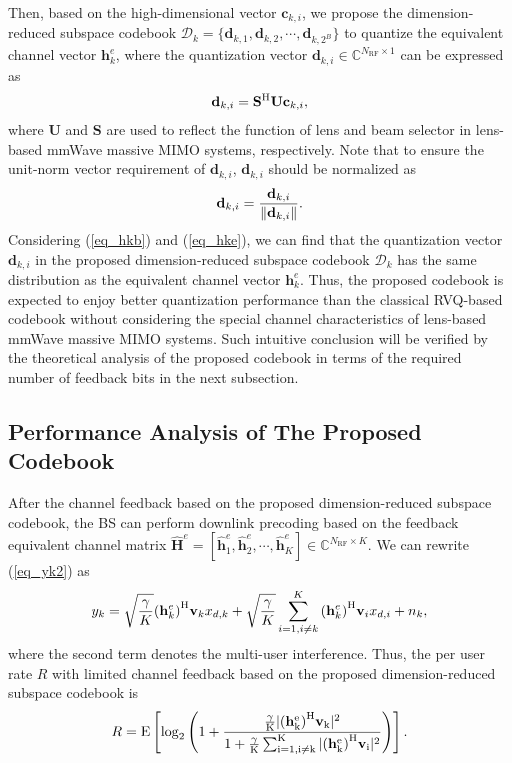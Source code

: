 \documentclass[10pt,twocolumn,twoside]{IEEEtran}
\begin{document}
Then, based on the high-dimensional vector $\mathbf{c}_{k,i}$, we propose the dimension-reduced subspace codebook $\mathcal{D}_k=\{\mathbf{d}_{k,1},\mathbf{d}_{k,2},\cdots,\mathbf{d}_{k,2^B}\}$ to quantize the equivalent channel vector $\mathbf{h}_k^e$, where the quantization vector $\mathbf{d}_{k,i}\in\mathbb{C}^{N_\text{RF}\times 1}$ can be expressed as
\begin{align}\label{eq_dki1}
\mathbf{d}_{k,i}=\mathbf{S}^{\rm{H}}\mathbf{U}\mathbf{c}_{k,i},
\end{align}
where $\mathbf{U}$ and $\mathbf{S}$ are used to reflect the function of lens and beam selector in lens-based mmWave massive MIMO systems, respectively.
Note that to ensure the unit-norm vector requirement of $\mathbf{d}_{k,i}$, $\mathbf{d}_{k,i}$ should be normalized as
\begin{align} \label{eq_dki2}
\vspace{-1mm}
\mathbf{d}_{k,i}=\frac{\mathbf{d}_{k,i}}{\|\mathbf{d}_{k,i}\|}.
\vspace{-1mm}
\end{align}
Considering (\ref{eq_hkb}) and (\ref{eq_hke}), we can find that the quantization vector $\mathbf{d}_{k,i}$ in the proposed dimension-reduced subspace codebook $\mathcal{D}_k$ has the same distribution as the equivalent channel vector $\mathbf{h}_k^e$.
Thus, the proposed codebook is expected to enjoy better quantization performance than the classical RVQ-based codebook without considering the special channel characteristics of lens-based mmWave massive MIMO systems.
Such intuitive conclusion will be verified by the theoretical analysis of the proposed codebook in terms of the required number of feedback bits in the next subsection.

\subsection{Performance Analysis of The Proposed Codebook}\label{S3.3}
After the channel feedback based on the proposed dimension-reduced subspace codebook, the BS can perform downlink precoding based on the feedback equivalent channel matrix $\mathbf{\hat{H}}^e=[\mathbf{\hat{h}}_1^e,\mathbf{\hat{h}}_2^e,\cdots,\mathbf{\hat{h}}_K^e]\in\mathbb{C}^{N_{\text{RF}}\times K}$.
We can rewrite (\ref{eq_yk2}) as
 \begin{align}
y_k=\sqrt{\frac{\gamma}{K}}{(\mathbf{h}_k^e)}^{\rm{H}}\mathbf{v}_kx_{d,k}+\sqrt{\frac{\gamma}{K}}\sum_{i=1,i\neq k}^{K}{(\mathbf{h}_k^e)}^{\rm{H}}\mathbf{v}_ix_{d,i}+n_k,
\end{align}
where the second term denotes the multi-user interference. Thus, the per user rate $R$ with limited channel feedback based on the proposed dimension-reduced subspace codebook is
 \begin{align}
R=\rm{E}\left[ \log_2\left( 1+\frac{\frac{\gamma}{K}|{(\mathbf{h}_k^e)}^{\rm{H}}\mathbf{v}_k|^2}{1+\frac{\gamma}{K}\sum_{i=1,i\neq k}^{K}|{(\mathbf{h}_k^e)}^{\rm{H}}\mathbf{v}_i|^2}\right) \right] .
\end{align}
\end{document}
